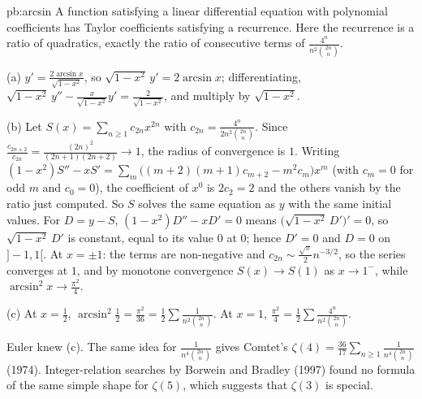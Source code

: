 \begin{solution}{pb:arcsin}
\idea A function satisfying a linear differential equation with polynomial coefficients has Taylor coefficients satisfying a
recurrence. Here the recurrence is a ratio of quadratics, exactly the ratio of consecutive terms of $\frac{4^n}{n^2\binom{2n}n}$.

\writeup (a) $y'=\frac{2\arcsin x}{\sqrt{1-x^2}}$, so $\sqrt{1-x^2}\,y'=2\arcsin x$; differentiating, $\sqrt{1-x^2}\,y''-\frac x{\sqrt{1-x^2}}y'=\frac2{\sqrt{1-x^2}}$, and
multiply by $\sqrt{1-x^2}$.

(b) Let $S(x)=\sum_{n\ge1}c_{2n}x^{2n}$ with $c_{2n}=\frac{4^n}{2n^2\binom{2n}n}$. Since $\frac{c_{2n+2}}{c_{2n}}=\frac{(2n)^2}{(2n+1)(2n+2)}\to1$, the radius of
convergence is $1$. Writing $(1-x^2)S''-xS'=\sum_m\bigl((m+2)(m+1)c_{m+2}-m^2c_m\bigr)x^m$ (with $c_m=0$ for odd $m$ and $c_0=0$), the coefficient
of $x^0$ is $2c_2=2$ and the others vanish by the ratio just computed. So $S$ solves the same equation as $y$ with the same initial values.
For $D=y-S$, $(1-x^2)D''-xD'=0$ means $\bigl(\sqrt{1-x^2}\,D'\bigr)'=0$, so $\sqrt{1-x^2}\,D'$ is constant, equal to its value $0$ at $0$; hence $D'=0$
and $D=0$ on $]-1,1[$. At $x=\pm1$: the terms are non-negative and $c_{2n}\sim\frac{\sqrt{\pi}}2n^{-3/2}$, so the series converges at $1$,
and by monotone convergence $S(x)\to S(1)$ as $x\to1^-$, while $\arcsin^2x\to\frac{\pi^2}4$.

(c) At $x=\frac12$, $\arcsin^2\frac12=\frac{\pi^2}{36}=\frac12\sum\frac1{n^2\binom{2n}n}$. At $x=1$, $\frac{\pi^2}4=\frac12\sum\frac{4^n}{n^2\binom{2n}n}$.

\leads Euler knew (c). The same idea for $\frac1{n^4\binom{2n}n}$ gives Comtet's $\zeta(4)=\frac{36}{17}\sum_{n\ge1}\frac1{n^4\binom{2n}n}$ (1974). Integer-relation
searches by Borwein and Bradley (1997) found no formula of the same simple shape for $\zeta(5)$, which suggests that $\zeta(3)$ is special.
\end{solution}

